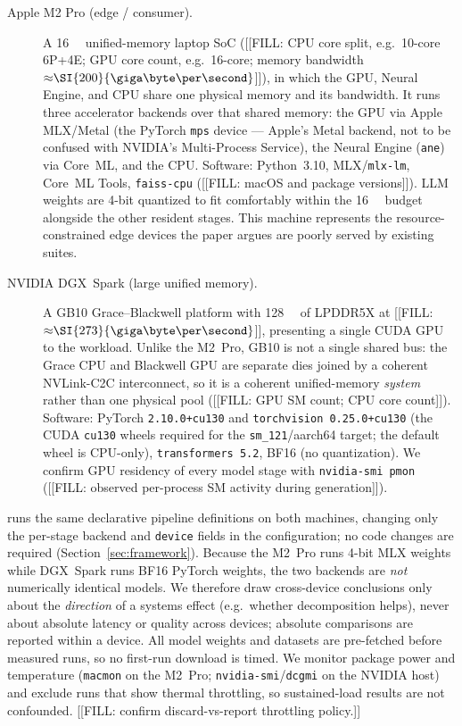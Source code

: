 \begin{description}
  \item[Apple M2 Pro (edge / consumer).] A \SI{16}{\giga\byte}
    unified-memory laptop SoC
    ([[FILL: CPU core split, e.g.\ 10-core 6P+4E; GPU core count, e.g.\ 16-core; memory bandwidth ${\approx}\SI{200}{\giga\byte\per\second}$]]),
    in which the GPU, Neural Engine, and CPU share one physical memory and its
    bandwidth. It runs three accelerator backends over that shared memory: the
    GPU via Apple MLX/Metal (the PyTorch \texttt{mps} device --- Apple's Metal
    backend, not to be confused with NVIDIA's Multi-Process Service), the
    Neural Engine (\texttt{ane}) via Core~ML, and the CPU. Software:
    Python~3.10, MLX/\texttt{mlx-lm}, Core~ML Tools, \texttt{faiss-cpu}
    ([[FILL: macOS and package versions]]). LLM weights are 4-bit quantized to
    fit comfortably within the \SI{16}{\giga\byte} budget alongside the other
    resident stages. This machine represents the resource-constrained edge
    devices the paper argues are poorly served by existing suites.

  \item[NVIDIA DGX~Spark (large unified memory).] A GB10 Grace--Blackwell
    platform with \SI{128}{\giga\byte} of LPDDR5X at
    [[FILL: ${\approx}\SI{273}{\giga\byte\per\second}$]], presenting a single
    CUDA GPU to the workload. Unlike the M2~Pro, GB10 is not a single shared
    bus: the Grace CPU and Blackwell GPU are separate dies joined by a coherent
    NVLink-C2C interconnect, so it is a coherent unified-memory \emph{system}
    rather than one physical pool
    ([[FILL: GPU SM count; CPU core count]]).
    Software: PyTorch \texttt{2.10.0+cu130} and \texttt{torchvision
    0.25.0+cu130} (the CUDA \texttt{cu130} wheels required for the
    \texttt{sm\_121}/aarch64 target; the default wheel is CPU-only),
    \texttt{transformers~5.2}, BF16 (no quantization). We confirm GPU residency
    of every model stage with \texttt{nvidia-smi pmon}
    ([[FILL: observed per-process SM activity during generation]]).
\end{description}

\sysname{} runs the same declarative pipeline definitions on both machines,
changing only the per-stage backend and \texttt{device} fields in the
configuration; no code changes are required (Section~\ref{sec:framework}).
Because the M2~Pro runs 4-bit MLX weights while DGX~Spark runs BF16 PyTorch
weights, the two backends are \emph{not} numerically identical models. We
therefore draw cross-device conclusions only about the \emph{direction} of a
systems effect (e.g.\ whether decomposition helps), never about absolute
latency or quality across devices; absolute comparisons are reported within a
device. All model weights and datasets are pre-fetched before measured runs, so
no first-run download is timed. We monitor package power and temperature
(\texttt{macmon} on the M2~Pro; \texttt{nvidia-smi}/\texttt{dcgmi} on the NVIDIA
host) and exclude runs that show thermal throttling, so sustained-load results
are not confounded. [[FILL: confirm discard-vs-report throttling policy.]]


